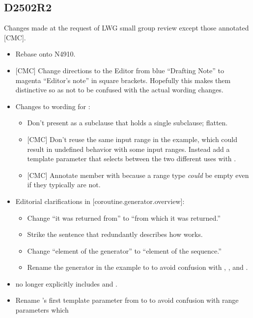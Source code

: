 \documentclass{wg21}
\begin{document}
\subsection{D2502R2}
Changes made at the request of LWG small group review except those annotated
[CMC].
\begin{itemize}
\item Rebase onto N4910.
\item{} [CMC] Change directions to the Editor from blue ``Drafting Note'' to
  magenta ``Editor's note'' in square brackets. Hopefully this makes them
  distinctive so as not to be confused with the actual wording changes.
\item Changes to wording for :
  \begin{itemize}
    \item Don't present as a subclause that holds a single subclause; flatten.
    \item{} [CMC] Don't reuse the same input range in the example, which could
      result in undefined behavior with some input ranges. Instead add a
       template parameter that selects between the two different
      uses with .
    \item{} [CMC] Annotate member 
      with 
      because a range type \emph{could} be empty
      even if they typically are not.
  \end{itemize}
\item Editorial clarifications in [coroutine.generator.overview]:
  \begin{itemize}
    \item Change ``it was returned from'' to ``from which it was returned.''
    \item Strike the sentence that redundantly describes how 
      works.
    \item Change ``element of the generator'' to ``element of the sequence.''
    \item Rename the  generator in the example to 
      to avoid confusion with , ,
      and .
  \end{itemize}
\item {} no longer explicitly includes
   and .
\item Rename 's first template parameter
  from  to  to avoid confusion with range parameters which

\end{itemize}
\end{document}

